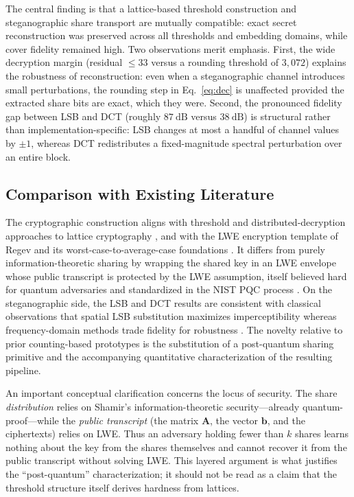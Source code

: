 \documentclass[runningheads]{llncs}
\begin{document}
The central finding is that a lattice-based threshold construction and
steganographic share transport are mutually compatible: exact secret
reconstruction was preserved across all thresholds and embedding domains, while
cover fidelity remained high. Two observations merit emphasis. First, the wide
decryption margin (residual $\le 33$ versus a rounding threshold of $3{,}072$)
explains the robustness of reconstruction: even when a steganographic channel
introduces small perturbations, the rounding step in Eq.~\eqref{eq:dec} is
unaffected provided the extracted share bits are exact, which they were.
Second, the pronounced fidelity gap between LSB and DCT (roughly
$87~\mathrm{dB}$ versus $38~\mathrm{dB}$) is structural rather than
implementation-specific: LSB changes at most a handful of channel values by
$\pm1$, whereas DCT redistributes a fixed-magnitude spectral perturbation over
an entire block.

\subsection{Comparison with Existing Literature}

The cryptographic construction aligns with threshold and distributed-decryption
approaches to lattice cryptography
\cite{bendlin2010,desmedt1994,gemmell1997}, and with the LWE encryption
template of Regev \cite{regev2005} and its worst-case-to-average-case
foundations \cite{peikert2009,micciancio2009}. It differs from purely
information-theoretic sharing \cite{shamir1979,blakley1979} by wrapping the
shared key in an LWE envelope whose public transcript is protected by the LWE
assumption, itself believed hard for quantum adversaries and standardized in
the NIST PQC process \cite{nist2024,avanzi2020}. On the steganographic side,
the LSB and DCT results are consistent with classical observations that spatial
LSB substitution maximizes imperceptibility \cite{chan2004,bender1996} whereas
frequency-domain methods trade fidelity for robustness \cite{westfeld2001,fridrich2009}.
The novelty relative to prior counting-based prototypes is the substitution of
a post-quantum sharing primitive and the accompanying quantitative
characterization of the resulting pipeline.

An important conceptual clarification concerns the locus of security. The
share \emph{distribution} relies on Shamir's information-theoretic
security---already quantum-proof---while the \emph{public transcript} (the
matrix $\mathbf{A}$, the vector $\mathbf{b}$, and the ciphertexts) relies on
LWE. Thus an adversary holding fewer than $k$ shares learns nothing about the
key from the shares themselves and cannot recover it from the public transcript
without solving LWE. This layered argument is what justifies the
``post-quantum'' characterization; it should not be read as a claim that the
threshold structure itself derives hardness from lattices.
\end{document}
